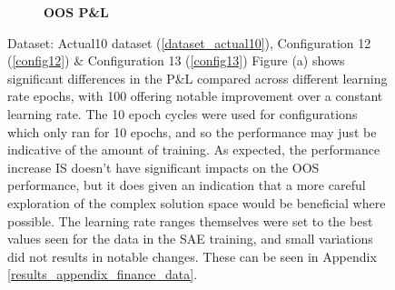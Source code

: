 \documentclass[a4paper,11pt,oneside]{article}
\theoremstyle{plain}
\theoremstyle{definition}
\begin{document}
\begin{figure}[H]
\begin{subfigure}{.5\textwidth}
			\caption{\textbf{OOS P\&L} 
				\newline }
			\label{figure-actual_oos_pl_lr_epochs}
		\end{subfigure}
		\caption[Effects of Epoch Cycle Lengths on P\&L]
		{Dataset: Actual10 dataset (\ref{dataset_actual10}), Configuration 12 (\ref{config12}) \& Configuration 13 (\ref{config13})
		\newline Figure (a) shows significant differences in the P\&L compared across different learning rate epochs, with 100 offering notable improvement over  a constant learning rate. The 10 epoch cycles were used for configurations which only ran for 10 epochs, and so the performance may just be indicative of the amount of training. As expected, the performance increase IS doesn't have significant impacts on the OOS performance, but it does given an indication that a more careful exploration of the complex solution space would be beneficial where possible.
		\newline\newline
		The learning rate ranges themselves were set to the best values seen for the data in the SAE training, and small variations did not results in notable changes. These can be seen in Appendix \ref{results_appendix_finance_data}.}
		\label{figure-actual_pl_lr_epochs}
	\end{figure}
	
\end{document}

